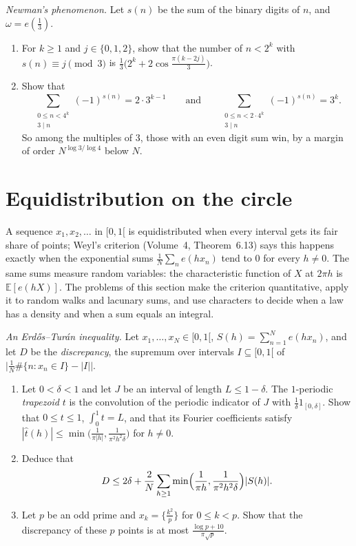 \begin{exercise}[$\star\star$]\label{pb:newman}
\emph{Newman's phenomenon.} Let $s(n)$ be the sum of the binary digits of $n$, and $\omega=e(\frac13)$.
\begin{enumerate}[label=(\alph*)]
\item For $k\ge1$ and $j\in\{0,1,2\}$, show that the number of $n<2^k$ with $s(n)\equiv j\pmod3$ is $\frac13\bigl(2^k+2\cos\frac{\pi(k-2j)}3\bigr)$.
\item Show that
\[
\sum_{\substack{0\le n<4^k\\3\mid n}}(-1)^{s(n)}=2\cdot3^{k-1}\qquad\text{and}\qquad\sum_{\substack{0\le n<2\cdot4^k\\3\mid n}}(-1)^{s(n)}=3^k.
\]
So among the multiples of $3$, those with an even digit sum win, by a margin of order $N^{\log3/\log4}$ below $N$.
\end{enumerate}
\end{exercise}

\section{Equidistribution on the circle}

A sequence $x_1,x_2,\dots$ in $[0,1[$ is equidistributed when every interval gets its fair share of points; Weyl's criterion
(Volume~4, Theorem~6.13) says this happens exactly when the exponential sums $\frac1N\sum_ne(hx_n)$ tend to $0$ for every $h\ne0$. The
same sums measure random variables: the characteristic function of $X$ at $2\pi h$ is $\mathbb E[e(hX)]$. The problems of this
section make the criterion quantitative, apply it to random walks and lacunary sums, and use characters to decide when a
law has a density and when a sum equals an integral.

\begin{exercise}[$\star\star\star$]\label{pb:erdosturan}
\emph{An Erdős--Turán inequality.} Let $x_1,\dots,x_N\in[0,1[$, $S(h)=\sum_{n=1}^Ne(hx_n)$, and let $D$ be the \emph{discrepancy}, the
supremum over intervals $I\subseteq[0,1[$ of $\bigl|\frac1N\#\{n:x_n\in I\}-|I|\bigr|$.
\begin{enumerate}[label=(\alph*)]
\item Let $0<\delta<1$ and let $J$ be an interval of length $L\le1-\delta$. The $1$-periodic \emph{trapezoid} $t$ is the convolution
of the periodic indicator of $J$ with $\frac1\delta1_{[0,\delta]}$. Show that $0\le t\le1$, $\int_0^1t=L$, and that its Fourier
coefficients satisfy $|\hat t(h)|\le\min\bigl(\frac1{\pi|h|},\frac1{\pi^2h^2\delta}\bigr)$ for $h\ne0$.
\item Deduce that
\[
D\le2\delta+\frac2N\sum_{h\ge1}\min\Bigl(\frac1{\pi h},\frac1{\pi^2h^2\delta}\Bigr)|S(h)|.
\]
\item Let $p$ be an odd prime and $x_k=\{\frac{k^2}p\}$ for $0\le k<p$. Show that the discrepancy of these $p$ points is at most
$\frac{\log p+10}{\pi\sqrt p}$.
\end{enumerate}
\end{exercise}

